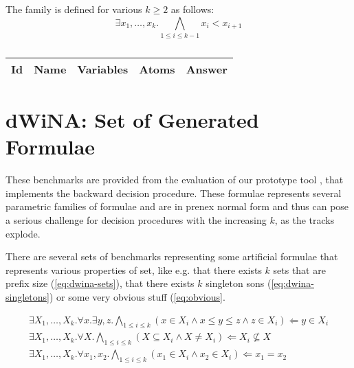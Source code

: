 The family is defined for various $k \geq 2$ as follows:
\begin{equation}
 \exists x_1,\ldots,x_k. \bigwedge_{1 \leq i \leq k - 1} x_i < x_{i+1}
\end{equation}

\begin{table}[h!]
 \centering
  \caption{}{\label{tab:bench-veanes}}
  \begin{tabular}{l l r r r}
  \hline
  \textbf{Id} & \textbf{Name} & \textbf{Variables} & \textbf{Atoms} & \textbf{Answer} \\
  \hline
  \hline
  
  \hline
  \end{tabular}
\end{table}

\section{dWiNA: Set of Generated Formulae}

These benchmarks are provided from the evaluation of our prototype tool \dwina, that implements the
backward decision procedure. These formulae represents several parametric families of formulae
and are in prenex normal form and thus can pose a serious challenge for decision procedures with
the increasing $k$, as the tracks explode.

There are several sets of benchmarks representing some artificial formulae that represents various
properties of set, like e.g. that there exists $k$ sets that are prefix size (\ref{eq:dwina-sets}),
that there exists $k$ singleton sons (\ref{eq:dwina-singletons}) or some very obvious stuff (\ref{eq:obvious}.

\begin{eqnarray}
  \exists X_1,\ldots, X_k. \forall x. \exists y, z. \bigwedge_{1 \leq i \leq k} 
   (x \in X_i \wedge x \leq y \leq z \wedge z \in X_i) \Leftarrow y \in X_i\label{eq:dwina-sets}\\
  \exists X_1,\ldots, X_k. \forall X. \bigwedge_{1 \leq i \leq k} (X \subseteq X_i \wedge X \neq X_i)
    \Leftarrow X_i \not\subseteq X\label{eq:obvious}\\
  \exists X_1,\ldots, X_k. \forall x_1, x_2. \bigwedge_{1 \leq i \leq k}
   (x_1 \in X_i \wedge x_2 \in X_i) \Leftarrow x_1 = x_2\label{eq:dwina-singletons}
\end{eqnarray}

